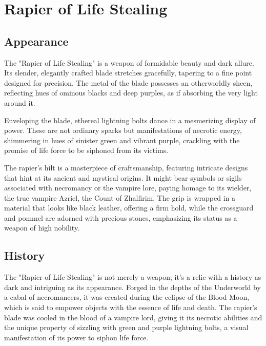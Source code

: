 
\chapter*{Rapier of Life Stealing}

\section*{Appearance}
The "Rapier of Life Stealing" is a weapon of formidable beauty and dark allure. Its slender, elegantly crafted blade stretches gracefully, tapering to a fine point designed for precision. The metal of the blade possesses an otherworldly sheen, reflecting hues of ominous blacks and deep purples, as if absorbing the very light around it.

Enveloping the blade, ethereal lightning bolts dance in a mesmerizing display of power. These are not ordinary sparks but manifestations of necrotic energy, shimmering in hues of sinister green and vibrant purple, crackling with the promise of life force to be siphoned from its victims.

The rapier's hilt is a masterpiece of craftsmanship, featuring intricate designs that hint at its ancient and mystical origins. It might bear symbols or sigils associated with necromancy or the vampire lore, paying homage to its wielder, the true vampire Azriel, the Count of Zhalfirim. The grip is wrapped in a material that looks like black leather, offering a firm hold, while the crossguard and pommel are adorned with precious stones, emphasizing its status as a weapon of high nobility.

\section*{History}
The "Rapier of Life Stealing" is not merely a weapon; it's a relic with a history as dark and intriguing as its appearance. Forged in the depths of the Underworld by a cabal of necromancers, it was created during the eclipse of the Blood Moon, which is said to empower objects with the essence of life and death. The rapier's blade was cooled in the blood of a vampire lord, giving it its necrotic abilities and the unique property of sizzling with green and purple lightning bolts, a visual manifestation of its power to siphon life force.

